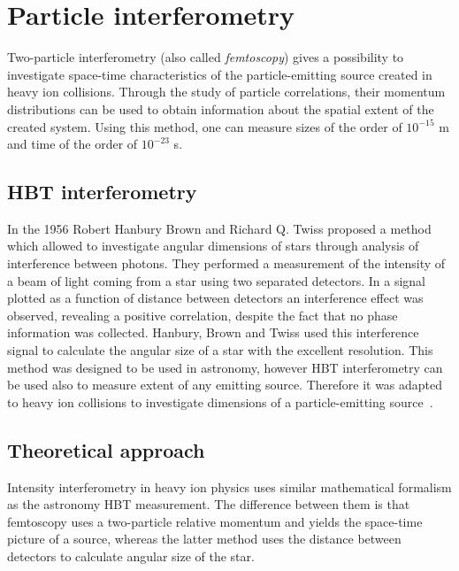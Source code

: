 %
\chapter{Particle interferometry}
\label{ch:pi}
  Two-particle interferometry (also called \textit{femtoscopy}) gives a possibility to investigate space-time characteristics of the particle-emitting source created in heavy ion collisions.
  Through the study of particle correlations, their momentum distributions can be used to obtain information about the spatial extent of the created system.
  Using this method, one can measure sizes of the order of $10^{-15}$ m and time of the order of $10^{-23}$ s.
  \section{HBT interferometry}
    In the 1956 Robert Hanbury Brown and Richard Q. Twiss proposed a method which allowed to investigate angular dimensions of stars through analysis of interference between photons.
    They performed a measurement of the intensity of a beam of light coming from a star using two separated detectors.
    In a signal plotted as a function of distance between detectors an interference effect was observed, revealing a positive correlation, despite the fact that no phase information was collected.
    Hanbury, Brown and Twiss used this interference signal to calculate the angular size of a star with the excellent resolution.
    This method was designed to be used in astronomy, however HBT interferometry can be used also to measure extent of any emitting source.
    Therefore it was adapted to heavy ion collisions to investigate dimensions of a particle-emitting source~\cite{drkisiel}.
  \section{Theoretical approach}
    Intensity interferometry in heavy ion physics uses similar mathematical formalism as the astronomy HBT measurement.
    The difference between them is that femtoscopy uses a two-particle relative momentum and yields the space-time picture of a source, whereas the latter method uses the distance between detectors to calculate angular size of the star.

